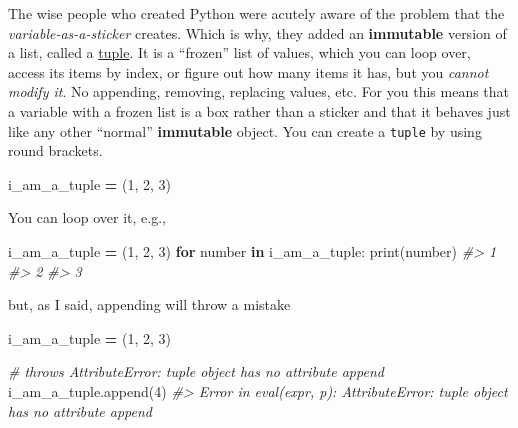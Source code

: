 \documentclass[
]{book}
\newenvironment{Shaded}{\begin{snugshade}}{\end{snugshade}}
\newcommand{\BuiltInTok}[1]{#1}
\newcommand{\CommentTok}[1]{\textcolor[rgb]{0.56,0.35,0.01}{\textit{#1}}}
\newcommand{\ControlFlowTok}[1]{\textcolor[rgb]{0.13,0.29,0.53}{\textbf{#1}}}
\newcommand{\DecValTok}[1]{\textcolor[rgb]{0.00,0.00,0.81}{#1}}
\newcommand{\KeywordTok}[1]{\textcolor[rgb]{0.13,0.29,0.53}{\textbf{#1}}}
\newcommand{\NormalTok}[1]{#1}
\newcommand{\OperatorTok}[1]{\textcolor[rgb]{0.81,0.36,0.00}{\textbf{#1}}}
\begin{document}
The wise people who created Python were acutely aware of the problem that the \emph{variable-as-a-sticker} creates. Which is why, they added an \textbf{immutable} version of a list, called a \href{https://docs.python.org/3/library/stdtypes.html?highlight=tuple\#tuple}{tuple}. It is a ``frozen'' list of values, which you can loop over, access its items by index, or figure out how many items it has, but you \emph{cannot modify it}. No appending, removing, replacing values, etc. For you this means that a variable with a frozen list is a box rather than a sticker and that it behaves just like any other ``normal'' \textbf{immutable} object. You can create a \texttt{tuple} by using round brackets.

\begin{Shaded}
\begin{Highlighting}[]
\NormalTok{i\_am\_a\_tuple }\OperatorTok{=}\NormalTok{ (}\DecValTok{1}\NormalTok{, }\DecValTok{2}\NormalTok{, }\DecValTok{3}\NormalTok{)}
\end{Highlighting}
\end{Shaded}

You can loop over it, e.g.,

\begin{Shaded}
\begin{Highlighting}[]
\NormalTok{i\_am\_a\_tuple }\OperatorTok{=}\NormalTok{ (}\DecValTok{1}\NormalTok{, }\DecValTok{2}\NormalTok{, }\DecValTok{3}\NormalTok{)}
\ControlFlowTok{for}\NormalTok{ number }\KeywordTok{in}\NormalTok{ i\_am\_a\_tuple:}
    \BuiltInTok{print}\NormalTok{(number)}
\CommentTok{\#\textgreater{} 1}
\CommentTok{\#\textgreater{} 2}
\CommentTok{\#\textgreater{} 3}
\end{Highlighting}
\end{Shaded}

but, as I said, appending will throw a mistake

\begin{Shaded}
\begin{Highlighting}[]
\NormalTok{i\_am\_a\_tuple }\OperatorTok{=}\NormalTok{ (}\DecValTok{1}\NormalTok{, }\DecValTok{2}\NormalTok{, }\DecValTok{3}\NormalTok{)}

\CommentTok{\# throws AttributeError: \textquotesingle{}tuple\textquotesingle{} object has no attribute \textquotesingle{}append\textquotesingle{}}
\NormalTok{i\_am\_a\_tuple.append(}\DecValTok{4}\NormalTok{)}
\CommentTok{\#\textgreater{} Error in eval(expr, p): AttributeError: \textquotesingle{}tuple\textquotesingle{} object has no attribute \textquotesingle{}append\textquotesingle{}}
\end{Highlighting}
\end{Shaded}
\end{document}
